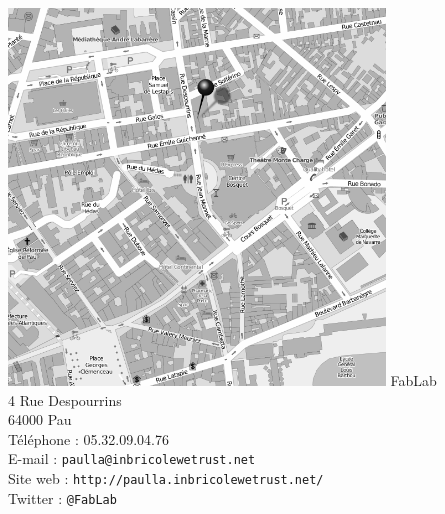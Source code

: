 \begin{center}
  \vfill
  \includegraphics[width=10cm]{carte.png}
  \vfill
  FabLab\\
  4 Rue Despourrins\\
  64000 Pau\\
  \vfill
  \medskip Téléphone : 05.32.09.04.76\\ %
  \medskip E-mail : \texttt{paulla@inbricolewetrust.net}\\%
  \medskip Site web : \texttt{http://paulla.inbricolewetrust.net/}\\%
  \medskip Twitter : \texttt{@FabLab}
  \vfill
\end{center}
